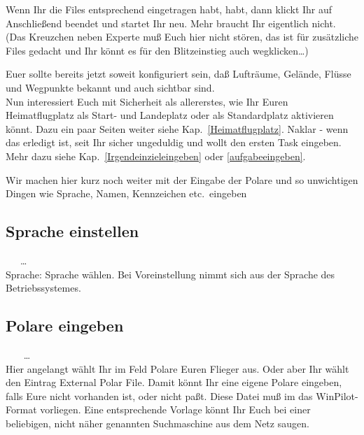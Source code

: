  Wenn Ihr die Files entsprechend eingetragen habt, habt, dann klickt Ihr auf  Anschließend beendet und startet Ihr \xc neu. Mehr braucht Ihr eigentlich nicht. (Das Kreuzchen neben Experte muß Euch hier nicht stören, das ist für zusätzliche Files gedacht und Ihr könnt es für den Blitzeinstieg auch wegklicken\dots )

Euer \xc sollte bereits jetzt soweit konfiguriert sein, daß Lufträume, Gelände, Flüsse und Wegpunkte bekannt und auch sichtbar sind.\\

Nun interessiert Euch mit Sicherheit als allererstes, wie Ihr Euren Heimatflugplatz als Start- und Landeplatz oder als Standardplatz aktivieren könnt. Dazu ein paar Seiten weiter siehe Kap.\ \ref{Heimatflugplatz}. Naklar - wenn das erledigt ist, seit Ihr sicher ungeduldig und wollt den ersten Task eingeben.
Mehr dazu siehe Kap.\ \ref{Irgendeinzieleingeben} oder \ref{aufgabeeingeben}.

Wir machen hier kurz noch weiter mit der Eingabe der Polare und so unwichtigen Dingen wie Sprache, Namen, Kennzeichen etc.\  eingeben

\subsection{Sprache einstellen}\label{Spracheeingeben}
\vspace*{0.5em}
 \blink~\blink~\blink~\far \far\dots{}\\[0.3em]

 \textsf{Sprache}: Sprache wählen. Bei \textsf{Voreinstellung} nimmt sich \xc aus der Sprache des Betriebssystemes.

\subsection{Polare eingeben}
\vspace*{0.5em}
\blink~\blink~\blink~ \far \far \dots \qquad {}\\[0.3em]

Hier angelangt wählt Ihr im Feld \textsf{Polare} Euren Flieger aus. Oder aber Ihr wählt den
Eintrag \textsf{External Polar File}. Damit könnt Ihr eine eigene Polare eingeben, falls Eure nicht vorhanden ist, oder nicht paßt. Diese Datei muß im das \textsf{WinPilot}-Format vorliegen.
Eine entsprechende Vorlage könnt Ihr Euch bei einer beliebigen, nicht näher genannten Suchmaschine aus dem Netz saugen.



